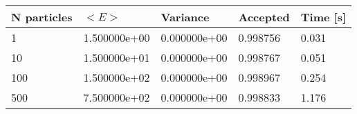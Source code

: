 \begin{table}[h!]
\centering 
\begin{tabular}{|l|l|l|l|l|}
\hline 
N particles & $<E>$ & Variance & Accepted & Time [s]\\ 
 \hline 
1 & 1.500000e+00 & 0.000000e+00 & 0.998756 & 0.031 \\ \hline 
10 & 1.500000e+01 & 0.000000e+00 & 0.998767 & 0.051 \\ \hline 
100 & 1.500000e+02 & 0.000000e+00 & 0.998967 & 0.254 \\ \hline 
500 & 7.500000e+02 & 0.000000e+00 & 0.998833 & 1.176 \\ \hline 
\end{tabular}
\label{tab:ia3} 
\end{table} 
